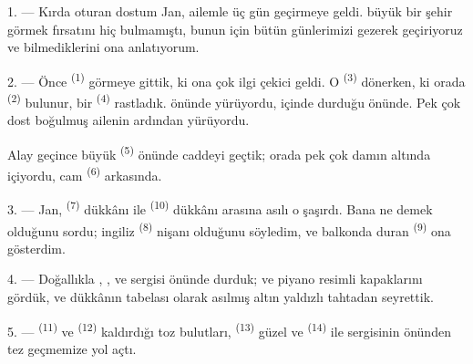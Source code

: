 
\VUsaut{4.0mm}
\VUsaut{3.0mm}

\VUsaut{3.0mm}

1. --- Kırda oturan dostum Jan, ailemle üç gün geçirmeye geldi.
 büyük bir şehir görmek fırsatını hiç bulmamıştı, bunun
için bütün günlerimizi gezerek geçiriyoruz ve bilmediklerini ona anlatıyorum.

2. --- Önce  \textsuperscript{(1)} görmeye gittik, ki ona
çok ilgi çekici geldi. O  \textsuperscript{(3)} dönerken, ki orada
 \textsuperscript{(2)} bulunur, bir
 \textsuperscript{(4)} rastladık. 
önünde  yürüyordu, içinde  durduğu
 önünde. Pek çok dost  boğulmuş ailenin
ardından yürüyordu.

Alay geçince büyük  \textsuperscript{(5)} önünde caddeyi
geçtik; orada pek çok  damın altında  içiyordu,
cam  \textsuperscript{(6)} arkasında.

3. --- Jan,  \textsuperscript{(7)} dükkânı ile
 \textsuperscript{(10)} dükkânı arasına asılı o
 şaşırdı. Bana ne demek olduğunu sordu; ingiliz
 \textsuperscript{(8)} nişanı olduğunu söyledim, ve
balkonda duran  \textsuperscript{(9)} ona gösterdim.

\VUsaut{3.0mm}

4. --- Doğallıkla , ,
 ve  sergisi önünde durduk;
 ve piyano  resimli kapaklarını gördük,
ve dükkânın tabelası olarak asılmış altın yaldızlı tahtadan 
seyrettik.

5. ---  \textsuperscript{(11)} ve
 \textsuperscript{(12)} kaldırdığı toz bulutları,
 \textsuperscript{(13)} güzel  ve
 \textsuperscript{(14)}  ile
 sergisinin önünden tez geçmemize yol açtı.

